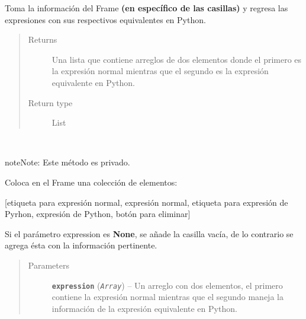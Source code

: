 \documentclass[letterpaper,10pt,english]{sphinxmanual}
\begin{document}
\begin{fulllineitems}
\begin{fulllineitems}
Toma la información del Frame \textbf{(en específico de las casillas)} 
y regresa las expresiones con sus respectivos equivalentes en Python.
\begin{quote}\begin{description}
\item[{Returns}] \leavevmode
Una lista que contiene arreglos de dos elementos donde el primero es
la expresión normal mientras que el segundo es la expresión equivalente en
Python.

\item[{Return type}] \leavevmode
List

\end{description}\end{quote}

\end{fulllineitems}


\begin{fulllineitems}
\label{View/Additional/MenuInternalOption/InternalOptionTab/ExpressionFrame:View.Additional.MenuInternalOption.InternalOptionTab.ExpressionFrame.ExpressionFrame._ExpressionFrame__insert_expression}~
\begin{notice}{note}{Note:}
Este método es privado.
\end{notice}

\begin{DUlineblock}{0em}
\item[] Coloca en el Frame una colección de elementos:
\item[] {[}etiqueta para expresión normal, expresión normal, etiqueta para expresión de Pyrhon, expresión de Python, botón para eliminar{]}
\item[] Si el parámetro expression es \textbf{None}, se añade la casilla vacía, de lo contrario se 
agrega ésta con la información pertinente.
\end{DUlineblock}
\begin{quote}\begin{description}
\item[{Parameters}] \leavevmode
\textbf{\texttt{expression}} (\emph{\texttt{Array}}) -- Un arreglo con dos elementos, el primero contiene la expresión normal
mientras que el segundo maneja la información de la expresión equivalente
en Python.

\end{description}\end{quote}


\end{fulllineitems}
\end{fulllineitems}
\end{document}
